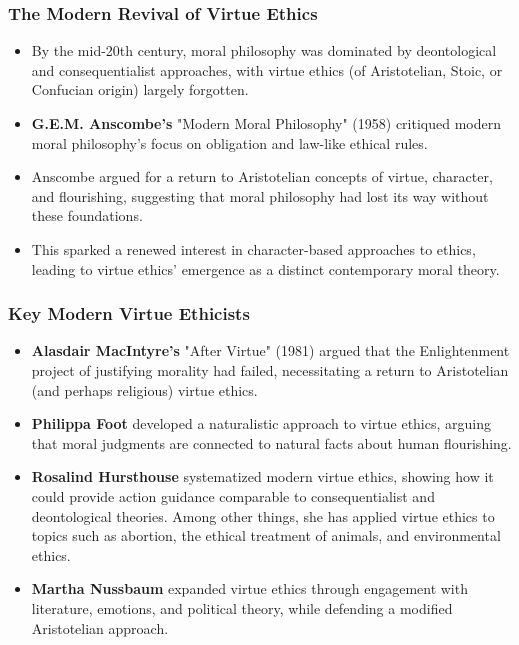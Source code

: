 \documentclass{beamer}
\begin{document}
\begin{frame}
    \frametitle{The Modern Revival of Virtue Ethics}
    \begin{itemize}
        \item By the mid-20th century, moral philosophy was dominated by deontological and consequentialist approaches, with virtue ethics (of Aristotelian, Stoic, or Confucian origin) largely forgotten.
        
        \item \textbf{G.E.M. Anscombe's} "Modern Moral Philosophy" (1958) critiqued modern moral philosophy's focus on obligation and law-like ethical rules. 
        
        \item Anscombe argued for a return to Aristotelian concepts of virtue, character, and flourishing, suggesting that moral philosophy had lost its way without these foundations.
        
        \item This sparked a renewed interest in character-based approaches to ethics, leading to virtue ethics' emergence as a distinct contemporary moral theory.
    \end{itemize}
\end{frame}

\begin{frame}
    \frametitle{Key Modern Virtue Ethicists}
    \begin{itemize}
        \item \textbf{Alasdair MacIntyre's} "After Virtue" (1981) argued that the Enlightenment project of justifying morality had failed, necessitating a return to Aristotelian (and perhaps religious) virtue ethics.
        
        \item \textbf{Philippa Foot} developed a naturalistic approach to virtue ethics, arguing that moral judgments are connected to natural facts about human flourishing.
        
        \item \textbf{Rosalind Hursthouse} systematized modern virtue ethics, showing how it could provide action guidance comparable to consequentialist and deontological theories. Among other things, she has applied virtue ethics to topics such as abortion, the ethical treatment of animals, and environmental ethics.
        
        \item \textbf{Martha Nussbaum} expanded virtue ethics through engagement with literature, emotions, and political theory, while defending a modified Aristotelian approach.
    \end{itemize}

\end{frame}
\end{document}
